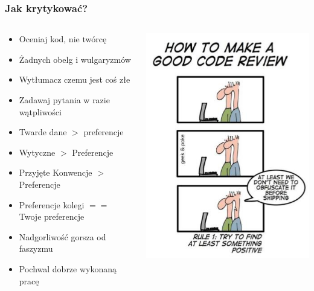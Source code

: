 \documentclass[xcolor=dvipsnames]{beamer}%
\begin{document}
\begin{frame}
	\frametitle{Jak krytykować?}
	\begin{columns}
		\begin{column}{0.6\textwidth}
			\begin{itemize}
				\item Oceniaj kod, nie twórcę
				\item Żadnych obelg i wulgaryzmów
				\item Wytłumacz czemu jest coś złe
				\item Zadawaj pytania w razie wątpliwości
				\item Twarde dane $>$ preferencje
				\item Wytyczne $>$ Preferencje
				\item Przyjęte Konwencje $>$ Preferencje
				\item Preferencje kolegi $==$ Twoje preferencje
				\item Nadgorliwość gorsza od faszyzmu
				\item Pochwal dobrze wykonaną pracę
			\end{itemize}
		\end{column}
		\begin{column}{0.4\textwidth}
			\includegraphics[width=\textwidth,height=\textheight,keepaspectratio]{figure/dobre_strony.jpg}
		\end{column}
	\end{columns}
\end{frame}
\end{document}
